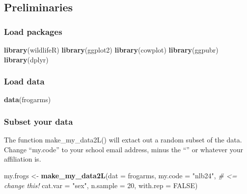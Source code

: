 \documentclass[]{book}
\newenvironment{Shaded}{\begin{snugshade}}{\end{snugshade}}
\newcommand{\KeywordTok}[1]{\textcolor[rgb]{0.13,0.29,0.53}{\textbf{#1}}}
\newcommand{\DataTypeTok}[1]{\textcolor[rgb]{0.13,0.29,0.53}{#1}}
\newcommand{\DecValTok}[1]{\textcolor[rgb]{0.00,0.00,0.81}{#1}}
\newcommand{\StringTok}[1]{\textcolor[rgb]{0.31,0.60,0.02}{#1}}
\newcommand{\CommentTok}[1]{\textcolor[rgb]{0.56,0.35,0.01}{\textit{#1}}}
\newcommand{\OtherTok}[1]{\textcolor[rgb]{0.56,0.35,0.01}{#1}}
\newcommand{\NormalTok}[1]{#1}
\theoremstyle{definition}
\theoremstyle{definition}
\theoremstyle{definition}
\theoremstyle{remark}
\begin{document}
\subsection{Preliminaries}\label{preliminaries-4}

\subsubsection{Load packages}\label{load-packages-3}

\begin{Shaded}
\begin{Highlighting}[]
\KeywordTok{library}\NormalTok{(wildlifeR)}
\KeywordTok{library}\NormalTok{(ggplot2)}
\KeywordTok{library}\NormalTok{(cowplot)}
\KeywordTok{library}\NormalTok{(ggpubr)}
\KeywordTok{library}\NormalTok{(dplyr)}
\end{Highlighting}
\end{Shaded}

\subsubsection{Load data}\label{load-data-3}

\begin{Shaded}
\begin{Highlighting}[]
\KeywordTok{data}\NormalTok{(frogarms)}
\end{Highlighting}
\end{Shaded}

\subsubsection{Subset your data}\label{subset-your-data-3}

The function make\_my\_data2L() will extact out a random subset of the
data. Change ``my.code'' to your school email address, minus the
``\citet{pitt.edu}'' or whatever your affiliation is.

\begin{Shaded}
\begin{Highlighting}[]
\NormalTok{my.frogs <-}\StringTok{ }\KeywordTok{make_my_data2L}\NormalTok{(}\DataTypeTok{dat =}\NormalTok{ frogarms, }
                           \DataTypeTok{my.code =} \StringTok{"nlb24"}\NormalTok{, }\CommentTok{# <=  change this!}
                           \DataTypeTok{cat.var =} \StringTok{"sex"}\NormalTok{,}
                           \DataTypeTok{n.sample =} \DecValTok{20}\NormalTok{, }
                           \DataTypeTok{with.rep =} \OtherTok{FALSE}\NormalTok{)}
\end{Highlighting}
\end{Shaded}
\end{document}
